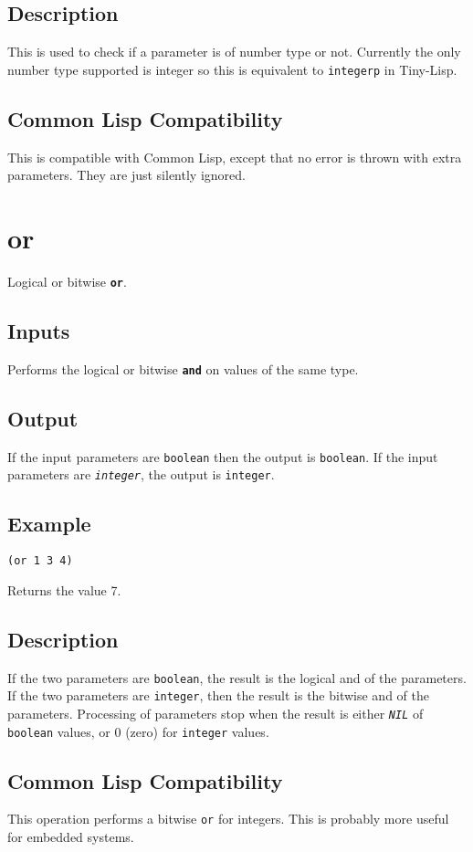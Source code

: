 \documentclass[10pt, openany]{book}
\newcommand{\operation}[1]{\textbf{\texttt{#1}}}
\newcommand{\constant}[1]{\emph{\texttt{#1}}}
\newcommand{\keyword}[1]{\texttt{#1}}
\newcommand{\datatype}[1]{\texttt{#1}}
\newcommand{\tl}{Tiny-Lisp}
\newcommand{\cl}{Common Lisp}
\begin{document}
\subsection{Description}
This is used to check if a parameter is of number type or not.  Currently the only number type supported is integer so this is equivalent to \keyword{integerp} in \tl.
\subsection{Common Lisp Compatibility}
This is compatible with \cl, except that no error is thrown with extra parameters.  They are just silently ignored.

\section{or}
Logical or bitwise \operation{or}.
\subsection{Inputs}
Performs the logical or bitwise \operation{and} on values of the same type.
\subsection{Output}
If the input parameters are \datatype{boolean} then the output is \datatype{boolean}.  If the input parameters are \constant{integer}, the output is \datatype{integer}.
\subsection{Example}
\begin{lstlisting}
(or 1 3 4)
\end{lstlisting}
Returns the value 7.
\subsection{Description}
If the two parameters are \datatype{boolean}, the result is the logical and of the parameters.  If the two parameters are \datatype{integer}, then the result is the bitwise and of the parameters.  Processing of parameters stop when the result is either \constant{NIL} of \datatype{boolean} values, or 0 (zero) for \datatype{integer} values.
\subsection{Common Lisp Compatibility}
This operation performs a bitwise \keyword{or} for integers.  This is probably more useful for embedded systems.
\end{document}
